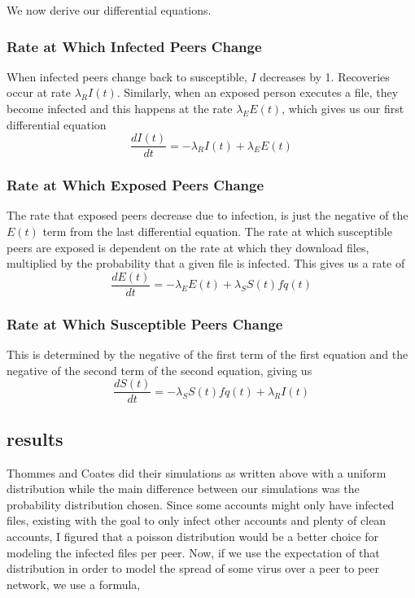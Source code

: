 \documentclass[12pt, oneside]{article}
\begin{document}
        We now derive our differential equations.
        \subsubsection{Rate at Which Infected Peers Change}
        When infected peers change back to susceptible,  $I$ decreases by 1. Recoveries occur at rate  $\lambda_R I(t)$.
        Similarly, when an exposed person executes a file, they become infected and this happens at the rate $\lambda_E E(t)$, which
        gives us our first differential equation \[
        \frac{dI(t)}{dt}=-\lambda_R I(t)+\lambda_E E(t)
        \] 
        \subsubsection{Rate at Which Exposed Peers Change}
        The rate that exposed peers decrease due to infection, is just the negative of the $E(t)$ term from the last differential equation.
        The rate at which susceptible peers are exposed is dependent on the rate at which they download files, multiplied by the probability
        that a given file is infected. This gives us a rate of \[
            \frac{dE(t)}{dt}=-\lambda_E E(t)+\lambda_S S(t)f{q(t)}
        \]
        \subsubsection{Rate at Which Susceptible Peers Change}
        This is determined by the negative of the first term of the first equation and the negative of the second term of the second equation, giving us
        \[
            \frac{dS(t)}{dt}=-\lambda_S S(t)f{q(t)}+\lambda_R I(t)
        \]
    \subsection{results}
    Thommes and Coates did their simulations as written above with a uniform distribution while the main difference between our simulations was the probability distribution chosen.
    Since some accounts might only have infected files, existing with the goal to only infect other accounts and plenty of clean accounts, I figured that a poisson distribution
    would be a better choice for modeling the infected files per peer. Now, if we use the expectation of that distribution in order to model the spread of some 
    virus over a peer to peer network, we use a formula, 




\end{document}
